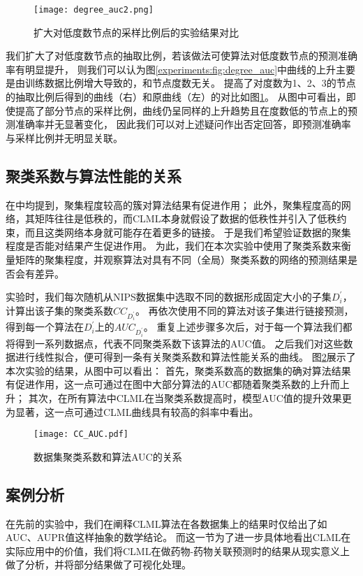 \begin{figure}
    \centering
    \texttt{[image: degree\_auc2.png]}
    \caption{扩大对低度数节点的采样比例后的实验结果对比}
    \label{experiments:fig:degree_auc2}
\end{figure}

我们扩大了对低度数节点的抽取比例，若该做法可使算法对低度数节点的预测准确率有明显提升，
则我们可以认为图\ref{experiments:fig:degree_auc}中曲线的上升主要是由训练数据比例增大导致的，和节点度数无关。
提高了对度数为1、2、3的节点的抽取比例后得到的曲线（右）和原曲线（左）的对比如图\ref{experiments:fig:degree_auc2}。
从图中可看出，即使提高了部分节点的采样比例，曲线仍呈同样的上升趋势且在度数低的节点上的预测准确率并无显著变化，
因此我们可以对上述疑问作出否定回答，即预测准确率与采样比例并无明显关联。


\subsection{聚类系数与算法性能的关系}
在\cite{lu2011link}\cite{valverde2014link}中均提到，聚集程度较高的簇对算法结果有促进作用；
此外，聚集程度高的网络，其矩阵往往是低秩的，而CLML本身就假设了数据的低秩性并引入了低秩约束，而且这类网络本身就可能存在着更多的链接。
于是我们希望验证数据的聚集程度是否能对结果产生促进作用。
为此，我们在本次实验中使用了聚类系数\cite{barrat2000properties}来衡量矩阵的聚集程度，并观察算法对具有不同（全局）聚类系数的网络的预测结果是否会有差异。

实验时，我们每次随机从NIPS数据集中选取不同的数据形成固定大小的子集$D_i^{'}$，计算出该子集的聚类系数$CC_{D_i^{'}}$。
再依次使用不同的算法对该子集进行链接预测，得到每一个算法在$D_i^{'}$上的$AUC_{D_i^{'}}$。
重复上述步骤多次后，对于每一个算法我们都将得到一系列数据点，代表不同聚类系数下该算法的AUC值。
之后我们对这些数据进行线性拟合，便可得到一条有关聚类系数和算法性能关系的曲线。
图\ref{experiments:fig:cc_auc}展示了本次实验的结果，从图中可以看出：
首先，聚类系数高的数据集的确对算法结果有促进作用，这一点可通过在图中大部分算法的AUC都随着聚类系数的上升而上升；
其次，在所有算法中CLML在当聚类系数提高时，模型AUC值的提升效果更为显著，这一点可通过CLML曲线具有较高的斜率中看出。


\begin{figure}
    \centering
    \texttt{[image: CC\_AUC.pdf]}
    \caption{数据集聚类系数和算法AUC的关系}
    \label{experiments:fig:cc_auc}
\end{figure}


\subsection{案例分析}
在先前的实验中，我们在阐释CLML算法在各数据集上的结果时仅给出了如AUC、AUPR值这样抽象的数学结论。
而这一节为了进一步具体地看出CLML在实际应用中的价值，我们将CLML在做药物-药物关联预测时的结果从现实意义上做了分析，并将部分结果做了可视化处理。

